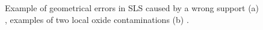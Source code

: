 \begin{figure}
    \centering
    \qquad
    \caption[Examples of defect in PBF.]{Example of geometrical errors in SLS caused by a wrong support (a) \cite{grasso_-process_2017}, examples of two local oxide contaminations (b) \cite{casati_microstructure_2016}.}
\end{figure} 
